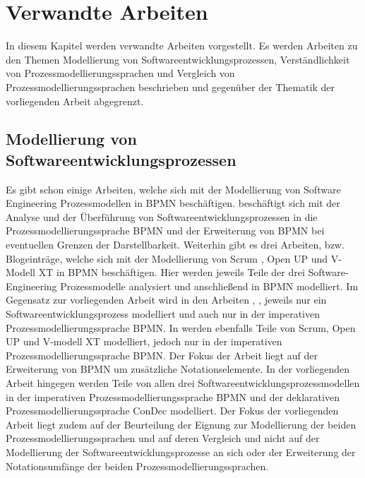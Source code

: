 \chapter{Verwandte Arbeiten}\label{sec:chapter9}

In diesem Kapitel werden verwandte Arbeiten vorgestellt. Es werden Arbeiten zu den Themen Modellierung von Softwareentwicklungsprozessen, Verständlichkeit von Prozessmodellierungssprachen und Vergleich von Prozessmodellierungssprachen beschrieben und gegenüber der Thematik der vorliegenden Arbeit abgegrenzt.

\section{Modellierung von Softwareentwicklungsprozessen}

Es gibt schon einige Arbeiten, welche sich mit der Modellierung von Software Engineering Prozessmodellen in BPMN beschäftigen.
\cite{Menhorn2014} beschäftigt sich mit der Analyse und der Überführung von Softwareentwicklungsprozessen in die Prozessmodellierungssprache BPMN und der Erweiterung von BPMN bei eventuellen Grenzen der Darstellbarkeit.\newline
Weiterhin gibt es drei Arbeiten, bzw. Blogeinträge, welche sich mit der Modellierung von Scrum \cite{software}, Open UP \cite{brunner2007fallstudie} und \cite{Bregenzer2014} V-Modell XT in BPMN beschäftigen. Hier werden jeweils Teile der drei Software-Engineering Prozessmodelle analysiert und anschließend in BPMN modelliert.\newline
Im Gegensatz zur vorliegenden Arbeit wird in den Arbeiten \cite{software}, \cite{brunner2007fallstudie}, \cite{Bregenzer2014} jeweils nur ein Softwareentwicklungsprozess modelliert und auch nur in der imperativen Prozessmodellierungssprache BPMN. In \cite{Menhorn2014} werden ebenfalls Teile von Scrum, Open UP und V-modell XT modelliert, jedoch nur in der imperativen Prozessmodellierungssprache BPMN. Der Fokus der Arbeit \cite{Menhorn2014} liegt auf der Erweiterung von BPMN um zusätzliche Notationselemente.\newline
In der vorliegenden Arbeit hingegen werden Teile von allen drei Softwareentwicklungsprozessmodellen in der imperativen Prozessmodellierungssprache BPMN und der deklarativen Prozessmodellierungssprache ConDec modelliert. Der Fokus der vorliegenden Arbeit liegt zudem auf der Beurteilung der Eignung zur Modellierung der beiden Prozessmodellierungssprachen und auf deren Vergleich und nicht auf der Modellierung der Softwareentwicklungsprozesse an sich oder der Erweiterung der Notationsumfänge der beiden Prozessmodellierungssprachen.\newline



